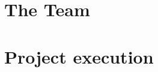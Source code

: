 \documentclass[12pt]{article}
\begin{document}


\newpage


\pagebreak

\section{The Team}

\section{Project execution}
\end{document}
